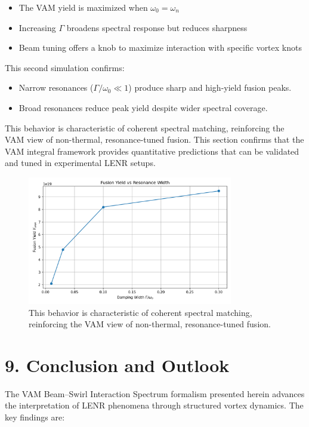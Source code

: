 \begin{itemize}
  \item The VAM yield is maximized when $\omega_0 = \omega_n$
  \item Increasing $\Gamma$ broadens spectral response but reduces sharpness
  \item Beam tuning offers a knob to maximize interaction with specific vortex knots
\end{itemize}

This second simulation confirms:
\begin{itemize}
  \item Narrow resonances ($\Gamma / \omega_0 \ll 1$) produce sharp and high-yield fusion peaks.
  \item Broad resonances reduce peak yield despite wider spectral coverage.
\end{itemize}

This behavior is characteristic of coherent spectral matching, reinforcing the VAM view of non-thermal, resonance-tuned fusion. This section confirms that the VAM integral framework provides quantitative predictions that can be validated and tuned in experimental LENR setups.


\begin{figure}[h!]
  \centering
  \includegraphics[width=0.8\textwidth]{Appendix_BeamSwirlInteractionSpectrumImage7}
  \caption{This behavior is characteristic of coherent spectral matching, reinforcing the VAM view of non-thermal, resonance-tuned fusion.}
\end{figure}

\section*{9. Conclusion and Outlook}

The VAM Beam--Swirl Interaction Spectrum formalism presented herein advances the interpretation of LENR phenomena through structured vortex dynamics. The key findings are:

